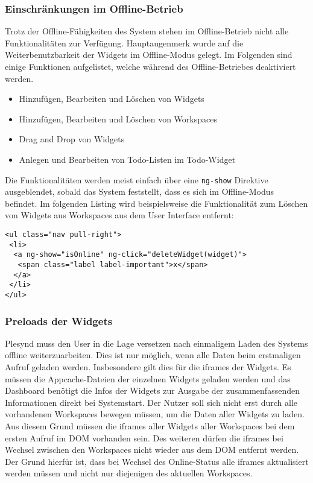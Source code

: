 \subsubsection{Einschränkungen im Offline-Betrieb}\label{section:einschraenkungen_im_offline_betrieb}
Trotz der Offline-Fähigkeiten des System stehen im Offline-Betrieb nicht alle Funktionalitäten zur Verfügung. Hauptaugenmerk wurde auf die Weiterbenutzbarkeit der Widgets im Offline-Modus gelegt. Im Folgenden sind einige Funktionen aufgelistet, welche während des Offline-Betriebes deaktiviert werden.
\begin{itemize}
 \item Hinzufügen, Bearbeiten und Löschen von Widgets
 \item Hinzufügen, Bearbeiten und Löschen von Workspaces
 \item Drag and Drop von Widgets
 \item Anlegen und Bearbeiten von Todo-Listen im Todo-Widget
\end{itemize}
 Die Funktionalitäten werden meist einfach über eine \texttt{ng-show} Direktive ausgeblendet, sobald das System feststellt, dass es sich im Offline-Modus befindet. Im folgenden Listing wird beispielsweise die Funktionalität zum Löschen von Widgets aus Workspaces aus dem User Interface entfernt:
\begin{lstlisting}
<ul class="nav pull-right">
 <li>
  <a ng-show="isOnline" ng-click="deleteWidget(widget)">
   <span class="label label-important">x</span>
  </a>
 </li>
</ul>
\end{lstlisting}

\subsubsection{Preloads der Widgets}
Plesynd muss den User in die Lage versetzen nach einmaligem Laden des Systems offline weiterzuarbeiten. Dies ist nur möglich, wenn alle Daten beim erstmaligen Aufruf geladen werden. Insbesondere gilt dies für die iframes der Widgets. Es müssen die Appcache-Dateien der einzelnen Widgets geladen werden und das Dashboard benötigt die Infos der Widgets zur Ausgabe der zusammenfassenden Informationen direkt bei Systemstart. Der Nutzer soll sich nicht erst durch alle vorhandenen Workspaces bewegen müssen, um die Daten aller Widgets zu laden. Aus diesem Grund müssen die iframes aller Widgets aller Workspaces bei dem ersten Aufruf im DOM vorhanden sein. Des weiteren dürfen die iframes bei Wechsel zwischen den Workspaces nicht wieder aus dem DOM entfernt werden. Der Grund hierfür ist, dass bei Wechsel des Online-Status alle iframes aktualisiert werden müssen und nicht nur diejenigen des aktuellen Workspaces.

